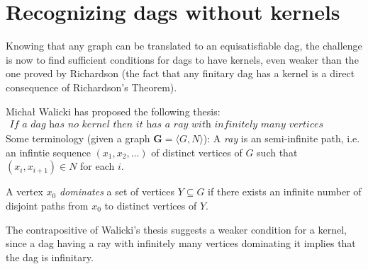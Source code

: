 
\section{Recognizing dags without kernels}
\label{sec:Recognizing dags without kernels}
Knowing that any graph can be translated to an equisatisfiable dag, the challenge is now to find sufficient conditions for dags to have kernels, even weaker than the one proved by Richardson (the fact that any finitary dag has a kernel is a direct consequence of Richardson's Theorem).

Michał Walicki has proposed the following thesis:
\begin{align}
  \textit{If a dag has no kernel then it has a ray with infinitely many vertices dominating it.}
\end{align}
Some terminology (given a graph $\mathbf{G} = \langle G,N \rangle$):
A \textit{ray} is an semi-infinite path, i.e. an infintie sequence $(x_1, x_2, \dots)$ of distinct vertices of $G$ such that $(x_i,x_{i+1}) \in N$ for each $i$.

A vertex $x_0$ \textit{dominates} a set of vertices $Y \subseteq G$ if there exists an infinite number of disjoint paths from $x_0$ to distinct vertices of $Y$.

The contrapositive of Walicki's thesis suggests a weaker condition for a kernel, since a dag having a ray with infinitely many vertices dominating it implies that the dag is infinitary.
